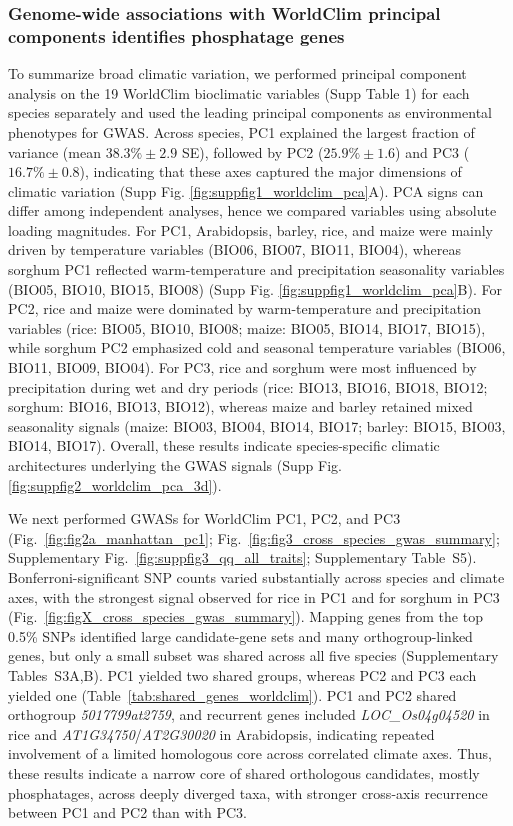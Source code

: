 \documentclass[unnumsec,webpdf,contemporary,large]{oup-authoring-template}%
\theoremstyle{thmstyleone}%
\theoremstyle{thmstyletwo}%
\theoremstyle{thmstylethree}%
\begin{document}
\subsubsection{Genome-wide associations with WorldClim principal components identifies phosphatage genes}

To summarize broad climatic variation, we performed principal component analysis on the 19 WorldClim bioclimatic variables (Supp Table 1) for each species separately and used the leading principal components as environmental phenotypes for GWAS. Across species, PC1 explained the largest fraction of variance (mean $38.3\% \pm 2.9$ SE), followed by PC2 ($25.9\% \pm 1.6$) and PC3 ($16.7\% \pm 0.8$), indicating that these axes captured the major dimensions of climatic variation (Supp Fig. \ref{fig:suppfig1_worldclim_pca}A). PCA signs can differ among independent analyses, hence we compared variables using absolute loading magnitudes. For PC1, Arabidopsis, barley, rice, and maize were mainly driven by temperature variables (BIO06, BIO07, BIO11, BIO04), whereas sorghum PC1 reflected warm-temperature and precipitation seasonality variables (BIO05, BIO10, BIO15, BIO08) (Supp Fig. \ref{fig:suppfig1_worldclim_pca}B). For PC2, rice and maize were dominated by warm-temperature and precipitation variables (rice: BIO05, BIO10, BIO08; maize: BIO05, BIO14, BIO17, BIO15), while sorghum PC2 emphasized cold and seasonal temperature variables (BIO06, BIO11, BIO09, BIO04). For PC3, rice and sorghum were most influenced by precipitation during wet and dry periods (rice: BIO13, BIO16, BIO18, BIO12; sorghum: BIO16, BIO13, BIO12), whereas maize and barley retained mixed seasonality signals (maize: BIO03, BIO04, BIO14, BIO17; barley: BIO15, BIO03, BIO14, BIO17). Overall, these results indicate species-specific climatic architectures underlying the GWAS signals (Supp Fig. \ref{fig:suppfig2_worldclim_pca_3d}).

We next performed GWASs for WorldClim PC1, PC2, and PC3 (Fig.~\ref{fig:fig2a_manhattan_pc1}; Fig.~\ref{fig:fig3_cross_species_gwas_summary}; Supplementary Fig.~\ref{fig:suppfig3_qq_all_traits}; Supplementary Table~S5). Bonferroni-significant SNP counts varied substantially across species and climate axes, with the strongest signal observed for rice in PC1 and for sorghum in PC3 (Fig.~\ref{fig:figX_cross_species_gwas_summary}). Mapping genes from the top 0.5\% SNPs identified large candidate-gene sets and many orthogroup-linked genes, but only a small subset was shared across all five species (Supplementary Tables~S3A,B). PC1 yielded two shared groups, whereas PC2 and PC3 each yielded one (Table~\ref{tab:shared_genes_worldclim}). PC1 and PC2 shared orthogroup \textit{5017799at2759}, and recurrent genes included \textit{LOC\_Os04g04520} in rice and \textit{AT1G34750}/\textit{AT2G30020} in Arabidopsis, indicating repeated involvement of a limited homologous core across correlated climate axes. Thus, these results indicate a narrow core of shared orthologous candidates, mostly phosphatages, across deeply diverged taxa, with stronger cross-axis recurrence between PC1 and PC2 than with PC3.
\end{document}
